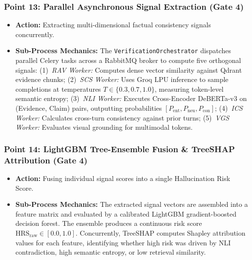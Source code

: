 \documentclass[11pt,a4paper]{article}
\begin{document}
\subsubsection*{Point 13: Parallel Asynchronous Signal Extraction (Gate 4)}
\begin{itemize}[leftmargin=*,itemsep=1pt]
  \item \textbf{Action:} Extracting multi-dimensional factual consistency signals concurrently.
  \item \textbf{Sub-Process Mechanics:} The \texttt{VerificationOrchestrator} dispatches parallel Celery tasks across a RabbitMQ broker to compute five orthogonal signals:
    (1)~\emph{RAV Worker:} Computes dense vector similarity against Qdrant evidence chunks;
    (2)~\emph{SCS Worker:} Uses Groq LPU inference to sample completions at temperatures $T \in \{0.3, 0.7, 1.0\}$, measuring token-level semantic entropy;
    (3)~\emph{NLI Worker:} Executes Cross-Encoder DeBERTa-v3 on (Evidence, Claim) pairs, outputting probabilities $[P_{\text{ent}}, P_{\text{neu}}, P_{\text{con}}]$;
    (4)~\emph{ICS Worker:} Calculates cross-turn consistency against prior turns;
    (5)~\emph{VGS Worker:} Evaluates visual grounding for multimodal tokens.
\end{itemize}

\subsubsection*{Point 14: LightGBM Tree-Ensemble Fusion \& TreeSHAP Attribution (Gate 4)}
\begin{itemize}[leftmargin=*,itemsep=1pt]
  \item \textbf{Action:} Fusing individual signal scores into a single Hallucination Risk Score.
  \item \textbf{Sub-Process Mechanics:} The extracted signal vectors are assembled into a feature matrix and evaluated by a calibrated LightGBM gradient-boosted decision forest. The ensemble produces a continuous risk score $\text{HRS}_{\text{raw}} \in [0.0, 1.0]$. Concurrently, TreeSHAP computes Shapley attribution values for each feature, identifying whether high risk was driven by NLI contradiction, high semantic entropy, or low retrieval similarity.
\end{itemize}
\end{document}
